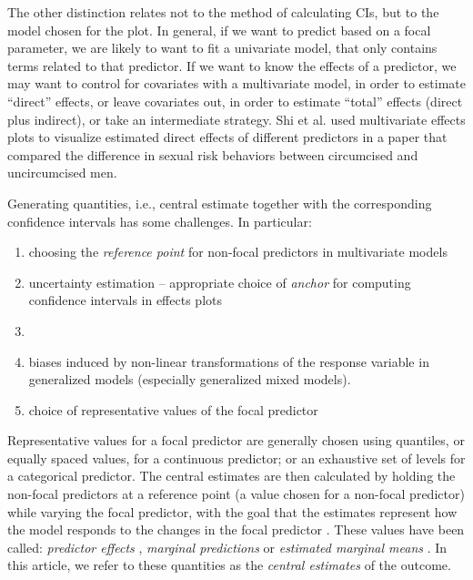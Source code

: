 The other distinction relates not to the method of calculating CIs, but to the model chosen for the plot. 
In general, if we want to predict based on a focal parameter, we are likely to want to fit a univariate model, that only contains terms related to that predictor.
If we want to know the effects of a predictor, we may want to control for covariates with a multivariate model, in order to estimate “direct” effects, or leave covariates out, in order to estimate “total” effects (direct plus indirect), or take an intermediate strategy.
Shi et al. \citep{shi_evidence_2017} used multivariate effects plots to visualize estimated direct effects of different predictors in a paper that compared the difference in sexual risk behaviors between circumcised and uncircumcised men.

Generating quantities, i.e., central estimate together with the corresponding confidence intervals has some challenges. In particular:
\begin{enumerate}
\item choosing the \emph{reference point} for non-focal predictors in multivariate models
\item uncertainty estimation -- appropriate choice of \emph{anchor} for computing confidence intervals in effects plots
\item {}  
\item biases induced by non-linear transformations of the response variable in generalized models (especially generalized mixed models).
\item choice of representative values of the focal predictor  
\end{enumerate}

Representative values for a focal predictor are generally chosen using quantiles, or equally spaced values, for a continuous predictor; or an exhaustive set of levels for a categorical predictor.
The central estimates are then calculated by holding the non-focal predictors at a reference point (a value chosen for a non-focal predictor) while varying the focal predictor, with the goal that the estimates represent how the model responds to the changes in the focal predictor \citep{fox2009effect, hanmer2013behind}. These values have been called: \emph{predictor effects} \citep{fox2009effect}, \emph{marginal predictions} \citep{leeper2017package} or \emph{estimated marginal means} \citep{lenth2018package}  . In this article, we refer to these quantities as the \emph{central estimates} of the outcome. 

